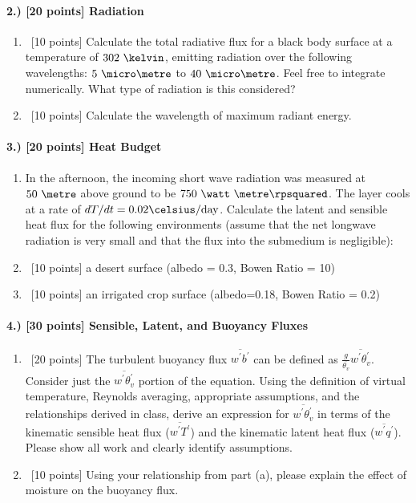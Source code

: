 \documentclass[11pt]{article}
\begin{document}
\vspace{-20pt}
\paragraph{2.) [20 points] Radiation}
\begin{enumerate}[label=\alph*.)]
\item ~[10 points] Calculate the total radiative flux for a black body surface at a temperature of $302\ \kelvin$, emitting radiation over the following wavelengths: $5\ \micro\metre$ to $40\ \micro\metre$. Feel free to integrate numerically. What type of radiation is this considered?
\item ~[10 points] Calculate the wavelength of maximum radiant energy.
\end{enumerate}

\paragraph{3.) [20 points] Heat Budget}
\begin{enumerate}[label=\alph*.)]
\item[] In the afternoon, the incoming short wave radiation was measured at $50\ \metre$ above ground to be $750\ \watt\ \metre\rpsquared$. The layer cools at a rate of $dT/dt = 0.02\celsius/\text{day}$. Calculate the latent and sensible heat flux for the following environments (assume that the net longwave radiation is very small and that the flux into the submedium is negligible):
\item ~[10 points] a desert surface (albedo = 0.3, Bowen Ratio = 10)
\item ~[10 points] an irrigated crop surface (albedo=0.18, Bowen Ratio = 0.2)
\end{enumerate}
 
\paragraph{4.) [30 points] Sensible, Latent, and Buoyancy Fluxes}
\begin{enumerate}[label=\alph*.)]
\item ~[20 points] The turbulent buoyancy flux $\overline{w^\prime b^\prime}$ can be defined as $\frac{g}{\overline{\theta_v}} \overline{w^\prime \theta_v^\prime}$. Consider just the $\overline{w^\prime \theta_v^\prime}$ portion of the equation. Using the definition of virtual temperature, Reynolds averaging, appropriate assumptions, and the relationships derived in class, derive an expression for $\overline{w^\prime \theta_v^\prime}$ in terms of the kinematic sensible heat
flux ($\overline{w^\prime T^\prime}$) and the kinematic latent heat flux ($\overline{w^\prime q^\prime}$). Please
show all work and clearly identify assumptions.

\item ~[10 points] Using your relationship from part (a), please explain the effect of moisture on the buoyancy flux.
\end{enumerate}
\end{document}
